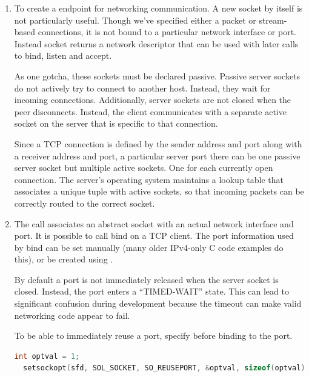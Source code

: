 \begin{enumerate}

  \item {}

  To create a endpoint for networking communication.
  A new socket by itself is not particularly useful.
  Though we've specified either a packet or stream-based connections, it is not bound to a particular network interface or port.
  Instead socket returns a network descriptor that can be used with later calls to bind, listen and accept.

  As one gotcha, these sockets must be declared passive.
  Passive server sockets do not actively try to connect to another host.
  Instead, they wait for incoming connections.
  Additionally, server sockets are not closed when the peer disconnects.
  Instead, the client communicates with a separate active socket on the server that is specific to that connection.

  Since a TCP connection is defined by the sender address and port along with a receiver address and port, a particular server port there can be one passive server socket but multiple active sockets.
  One for each currently open connection.
  The server's operating system maintains a lookup table that associates a unique tuple with active sockets, so that incoming packets can be correctly routed to the correct socket.

  \item {}

  The  call associates an abstract socket with an actual network interface and port.
  It is possible to call bind on a TCP client.
  The port information used by bind can be set manually (many older IPv4-only C code examples do this), or be created using .

  By default a port is not immediately released when the server socket is closed.
  Instead, the port enters a ``TIMED-WAIT'' state.
  This can lead to significant confusion during development because the timeout can make valid networking code appear to fail.

  To be able to immediately reuse a port, specify  before binding to the port.

  \begin{lstlisting}[language=C]
  int optval = 1;
  setsockopt(sfd, SOL_SOCKET, SO_REUSEPORT, &optval, sizeof(optval));


\end{lstlisting}
\end{enumerate}
